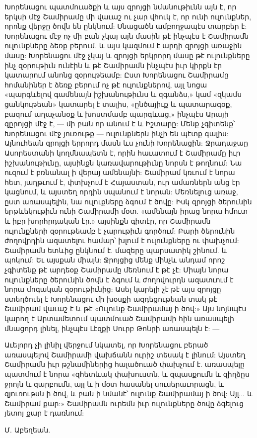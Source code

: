 \documentclass{article}
\begin{document}
{Խորենացու պատմուածքի և այս զրոյցի նմանութիւնն այն է, որ երկսի մէջ Շամիրամը մի վաւաշ ու չար վհուկ է, որ ունի ուլունքներ, որոնք վերջը ծովն են ընկնում: Սնացածն ամբողջապէս տարբեր է: Խորենացու մէջ ոչ մի բան չկայ այն մասին թէ ինչպէս է Շամիրամն ուլունքները ձեռք բերում. և այս կազմում է արդի զրոյցի առաջին մասը: Խորենացու մէջ չկայ և զրոյցի երկրորդ մասը թէ ուլունքները ինչ զօրութիւն ունէին և թէ Շամիրամն ինչպէս իւր կիրքն էր կատարում անոնց զօրութեամբ: Ըստ Խորենացու Շամիրամը հոմանիներ է ձեռք բերում ոչ թէ ուլունքներով, այլ նոցա «պարգևելով գամենայն իշխանութիւնս և զգանձս,» կամ «զկամս ցանկութեան» կատարել է տալիս, «ընծայիւք և պատարագօք, բազում աղաչանօք և խոստմամբ պարգևաց,» ինչպէս Արայի զըրոյցի մէջ է, — մի բան որ անում է և Իշտարը: Մենք չգիտենք՝ Խորենացու մէջ յուռութք — ուլունքներն ինչի են պէտք գալիս: Այնուհեան զրոյցի երրորդ մասն ևս չունի Խորենացին: Ջրադաջաը Ասորեստանի կողմնապետն է, որին հաւատում է Շամիրամը իւր իշխանութիւնը, այսինքն կառավարութիւնը նորսն է թողնում: Նա ուզում է բռնանալ ի վերայ ամենայնի: Շամիրամ կռւում է նորա հետ, յաղթւում է, փտխչում է Հայաստան, ուր ամառներն անց էր կացնում, և այստեղ որդին սպանում է նորան: Մեռնելուց առաջ, ըստ առասպելին, նա ուլուքները ձգում է ծովը: Իսկ զրոյցի ծերունին երթևեկութիւն ունի Շամիրամի մօտ. «ամենայն իրաց նորա հմուտ և իբր խորհրդական էր.» այսինքն գիտէր, որ Շամիրամն ուլունքների զօրութեամբ է չարութիւն գործում: Բարի ծերունին ժողովրդին ազատելու համար՝ խլում է ուլունքները ու փախչում: Շամիրամն ետևից ընկնում է. մազերը պարսատիկ շինում. և պոկում: Եւ այսքան միայն: Ջրոյցից մենք մինչև անդամ որոշ չգիտենք թէ արդեօք Շամիրամը մեռնում է թէ չէ: Միայն նորա ուլունքները ծերունին ծովն է ձգում և ժողովուրդն ազատւում է նորա մոգական զօրութիւնից: Ասել կարելի չէ թէ այս զրոյցը ստեղծուել է Խորենացու մի խօսքի ազդեցութեան տակ թէ Շամիրամ վաւաշ է և թէ «Ուլունք Շամիրամայ ի ծով:» Այս նոյնպէս կարող է Արտամետում պատմուած Շամիրամի հին առասպելի մնացորդ լինել, ինչպէս Լէզքի Սուրբ Թոնրի առասպելն է: —

Աւելորդ չի լինիլ վերջում նկատել, որ Խորենացու բերած առասպելով Շամիրամի վախճանն ուրիշ տեսակ է լինում: Այստեղ Շամիրամն իւր թշնամիներից հալածուած փախչում է. առասպելը պատմում է նորա «զհետևակ փախուստն, և զպասքումն և զիղձըս ջրոյն և զարբումն, այլ և ի մօտ հասանել սուսերաւորացն, և զյուռութսն ի ծով, և բան ի նմանէ՝ ուլունք Շամիրամայ ի ծով: Այլ... և Շամիրամ քար:» Շամիրամն ուրեմն իւր ուլունքները ծովը ձգելուց յետոյ քար է դառնում:

\bigskip

Մ. Աբեղեան.}
\clearpage
\end{document}
